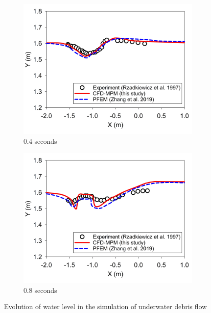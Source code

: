 \documentclass[preprint,12pt]{elsarticle}
\begin{document}
%
%
\begin{figure}[H]
\center
\begin{subfigure}[c]{0.5\linewidth}
\includegraphics[width=\linewidth]{0.4swater.jpg}
\caption{0.4 seconds}
\label{0.4swater}
\end {subfigure}\hfill    
\begin{subfigure}[d]{0.5\linewidth}
\includegraphics[width=\linewidth]{0.8swater.jpg}
\caption{0.8 seconds}
\label{0.8swater}
\end {subfigure}
\caption{Evolution of water level in the simulation of underwater debris flow}
\label{watersurface}
\end {figure}
%
%
\end{document}
